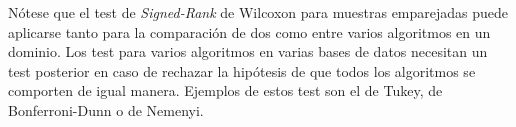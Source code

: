 	Nótese que el test de \textit{Signed-Rank} de Wilcoxon 
para muestras emparejadas puede aplicarse tanto para la 
comparación de dos como entre varios algoritmos en un 
dominio. Los test para varios algoritmos en varias bases de 
datos necesitan un test posterior en caso de rechazar la 
hipótesis de que todos los algoritmos se comporten de igual 
manera. Ejemplos de estos test son el de Tukey, de 
Bonferroni-Dunn o de Nemenyi. 
	
	
	
	
	
	
	
	
%
